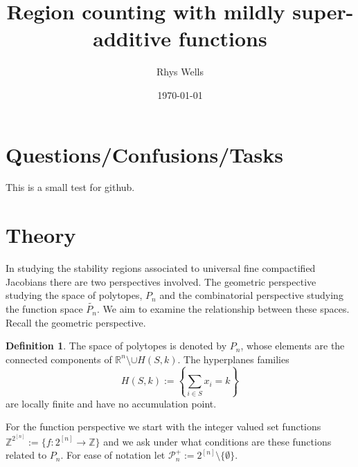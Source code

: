 \documentclass[a4paper,12pt]{article}
\title{Region counting with mildly super-additive functions}
\author{Rhys Wells}
\date{\today}
\theoremstyle{definition}
\newtheorem{definition}{Definition}[section]
\theoremstyle{indented}
\begin{document}
\maketitle
\tableofcontents

\section{Questions/Confusions/Tasks}

This is a small test for github.

\section{Theory}

In studying the stability regions associated to universal fine compactified Jacobians there are two perspectives involved. The geometric perspective studying the space of polytopes, $P_n$ and the combinatorial perspective studying the function space $\tilde{P_n}$. We aim to examine the relationship between these spaces. Recall the geometric perspective.      
\begin{definition}\label{polytopes}
The space of polytopes is denoted by $P_n$, whose elements are the connected components of $\mathbb{R}^n \setminus  \cup H(S,k)$. The hyperplanes families 
$$H(S,k):= \left\{ \sum_{i\in S} x_i = k \right\}$$
are locally finite and have no accumulation point.
\end{definition}



For the function perspective we start with the integer valued set functions $\mathbb{Z}^{2^{[n]}}:=\{ f: 2^{[n]} \rightarrow \mathbb{Z}\}$ and we ask under what conditions are these functions related to $P_n$. For ease of notation let $\mathcal{P}_n ^{+} := 2^{[n]} \setminus \{\emptyset\}$.
\end{document}
